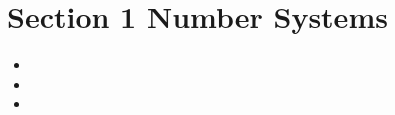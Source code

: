 \documentclass[MASTER.tex]{subfiles}
\begin{document}
\newpage

\section{Section 1 Number Systems}

\begin{itemize}
\item
\item
\item
\end{itemize}
\end{document}
